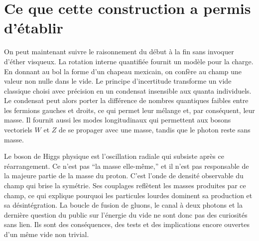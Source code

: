 \begin{classroomqa}\end{classroomqa}

\begin{classroomqa}\end{classroomqa}

\section{Ce que cette construction a permis d’établir}

On peut maintenant suivre le raisonnement du début à la fin sans invoquer d’éther visqueux. La rotation interne quantifiée fournit un modèle pour la charge. En donnant au bol la forme d’un chapeau mexicain, on confère au champ une valeur non nulle dans le vide. Le principe d’incertitude transforme un vide classique choisi avec précision en un condensat insensible aux quanta individuels. Le condensat peut alors porter la différence de nombres quantiques faibles entre les fermions gauches et droits, ce qui permet leur mélange et, par conséquent, leur masse. Il fournit aussi les modes longitudinaux qui permettent aux bosons vectoriels $W$ et $Z$ de se propager avec une masse, tandis que le photon reste sans masse.

Le boson de Higgs physique est l’oscillation radiale qui subsiste après ce réarrangement. Ce n’est pas ``la masse elle-même,'' et il n’est pas responsable de la majeure partie de la masse du proton. C’est l’onde de densité observable du champ qui brise la symétrie. Ses couplages reflètent les masses produites par ce champ, ce qui explique pourquoi les particules lourdes dominent sa production et sa désintégration. La boucle de fusion de gluons, le canal à deux photons et la dernière question du public sur l’énergie du vide ne sont donc pas des curiosités sans lien. Ils sont des conséquences, des tests et des implications encore ouvertes d’un même vide non trivial.
